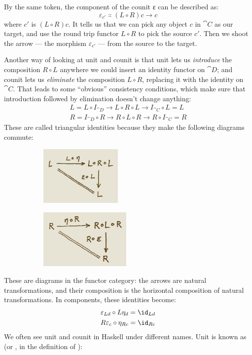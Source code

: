 \noindent
By the same token, the component of the counit ε can be described as:
\[\varepsilon_{c'} \Colon (L \circ R) c \to c\]
where $c'$ is $(L \circ R) c$. It tells us that we
can pick any object $c$ in $\cat{C}$ as our target, and use the
round trip functor $L \circ R$ to pick the source
$c'$. Then we shoot the arrow --- the morphism
$\varepsilon_{c'}$ --- from the source to the target.

Another way of looking at unit and counit is that unit lets us
\emph{introduce} the composition $R \circ L$ anywhere we could
insert an identity functor on $\cat{D}$; and counit lets us
\emph{eliminate} the composition $L \circ R$, replacing it with the
identity on $\cat{C}$. That leads to some ``obvious'' consistency
conditions, which make sure that introduction followed by elimination
doesn't change anything:
\begin{gather*}
L = L \circ I_{\cat{D}} \to L \circ R \circ L \to I_{\cat{C}} \circ L = L \\
R = I_{\cat{D}} \circ R \to R \circ L \circ R \to R \circ I_{\cat{C}} = R
\end{gather*}
These are called triangular identities because they make the following
diagrams commute:

\begin{figure}[H]
  \centering

  \begin{subfigure}
    \centering
    \includegraphics[width=40mm]{images/triangles.png}
  \end{subfigure}%
  \begin{subfigure}
    \centering
    \includegraphics[width=44.5mm]{images/triangles-2.png}
  \end{subfigure}
\end{figure}

\noindent
These are diagrams in the functor category: the arrows are natural
transformations, and their composition is the horizontal composition of
natural transformations. In components, these identities become:
\begin{gather*}
\varepsilon_{L d} \circ L \eta_d = \id_{L d} \\
R \varepsilon_c \circ \eta_{R c} = \id_{R c}
\end{gather*}
We often see unit and counit in Haskell under different names. Unit is
known as  (or , in the definition of
):

